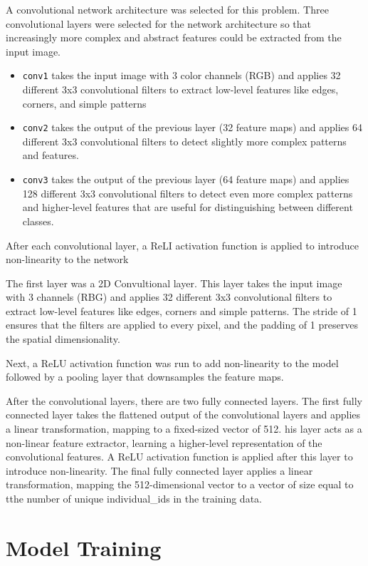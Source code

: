 \documentclass{article}
\begin{document}
A convolutional network architecture was selected for this problem. Three convolutional layers were selected for the network architecture so that increasingly more complex and 
abstract features could be extracted from the input image.

\begin{itemize}
    \item \verb|conv1|  takes the input image with 3 color channels (RGB) and applies 32 different 3x3 convolutional filters to extract low-level features like edges, corners, and simple patterns
    \item \verb|conv2| takes the output of the previous layer (32 feature maps) and applies 64 different 3x3 convolutional filters to detect slightly more complex patterns and features.
    \item \verb|conv3| takes the output of the previous layer (64 feature maps) and applies 128 different 3x3 convolutional filters to detect even more complex patterns and higher-level features that are useful for distinguishing between different classes.
\end{itemize}

After each convolutional layer, a ReLI activation function is applied to introduce non-linearity to the network


The first layer was a 2D Convultional layer. This layer takes the input image with 3 channels (RBG) and applies 32 different 3x3 convolutional filters to
extract low-level features like edges, corners and simple patterns. The stride of 1 ensures that the filters are applied to every pixel, and the 
padding of 1 preserves the spatial dimensionality. 

Next, a ReLU activation function was run to add non-linearity to the model followed by a pooling layer that downsamples the feature maps.

After the convolutional layers, there are two fully connected layers. The first fully connected layer takes the flattened output of the convolutional layers and applies a linear transformation, mapping to a fixed-sized vector of 512. his layer acts as a non-linear feature extractor, learning a higher-level representation of the convolutional features. A ReLU activation function is applied after this layer to introduce non-linearity.
The final fully connected layer applies a linear transformation, mapping the 512-dimensional vector to a vector of size equal to tthe number of unique individual\_ids in the training data.


\section{Model Training}
\end{document}
